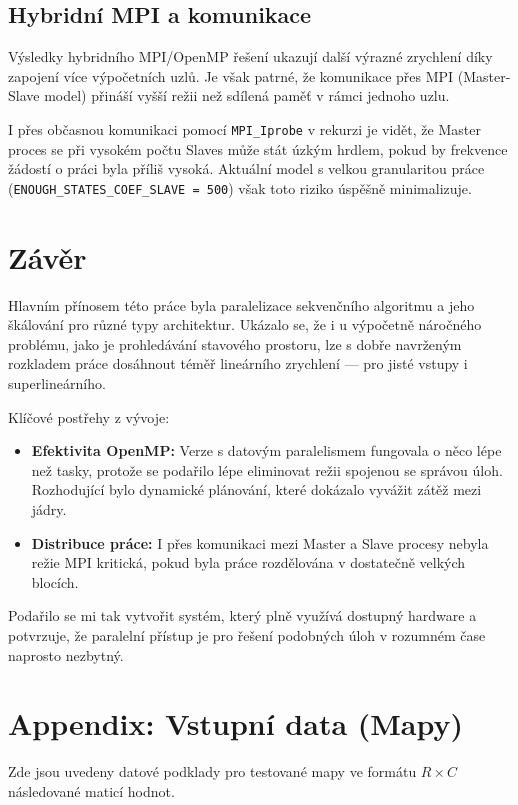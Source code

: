 \documentclass[11pt,a4paper]{article}
\begin{document}
\subsection{Hybridní MPI a komunikace}
Výsledky hybridního MPI/OpenMP řešení ukazují další výrazné zrychlení díky zapojení více výpočetních uzlů. Je však patrné, že komunikace přes MPI (Master-Slave model) přináší vyšší režii než sdílená paměť v rámci jednoho uzlu.

I přes občasnou komunikaci pomocí \texttt{MPI\_Iprobe} v rekurzi je vidět, že Master proces se při vysokém počtu Slaves může stát úzkým hrdlem, pokud by frekvence žádostí o práci byla příliš vysoká. Aktuální model s velkou granularitou práce (\texttt{ENOUGH\_STATES\_COEF\_SLAVE = 500}) však toto riziko úspěšně minimalizuje.


\section{Závěr}
Hlavním přínosem této práce byla paralelizace sekvenčního algoritmu a jeho škálování pro různé typy architektur. Ukázalo se, že i u výpočetně náročného problému, jako je prohledávání stavového prostoru, lze s dobře navrženým rozkladem práce dosáhnout téměř lineárního zrychlení --- pro jisté vstupy i superlineárního.

Klíčové postřehy z vývoje:
\begin{itemize}
    \item \textbf{Efektivita OpenMP:} Verze s datovým paralelismem fungovala o něco lépe než tasky, protože se podařilo lépe eliminovat režii spojenou se správou úloh. Rozhodující bylo dynamické plánování, které dokázalo vyvážit zátěž mezi jádry.
    \item \textbf{Distribuce práce:} I přes komunikaci mezi Master a Slave procesy nebyla režie MPI kritická, pokud byla práce rozdělována v dostatečně velkých blocích.
\end{itemize}

Podařilo se mi tak vytvořit systém, který plně využívá dostupný hardware a potvrzuje, že paralelní přístup je pro řešení podobných úloh v rozumném čase naprosto nezbytný.

\newpage

\section*{Appendix: Vstupní data (Mapy)}

Zde jsou uvedeny datové podklady pro testované mapy ve formátu $R \times C$ následované maticí hodnot.
\end{document}
